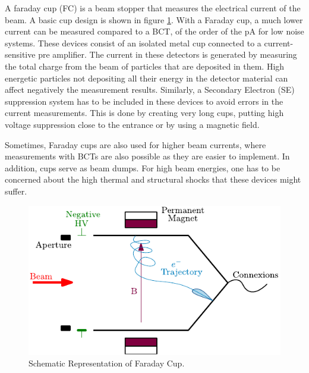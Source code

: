 A faraday cup (FC) is a beam stopper that measures the electrical current of the beam. A basic cup design is shown in figure \ref{fig:FaradayCup}. With a Faraday cup, a much lower current can be measured compared to a BCT, of the order of the \si[]{\pico \ampere} for low noise systems. These devices consist of an isolated metal cup connected to a current-sensitive pre amplifier. The current in these detectors is generated by measuring the total charge from the beam of particles that are deposited in them. High energetic particles not depositing all their energy in the detector material can affect negatively the measurement results. Similarly, a Secondary Electron (SE) suppression system has to be included in these devices to avoid errors in the current measurements. This is done by creating very long cups, putting high voltage suppression close to the entrance or by using a magnetic field. 

Sometimes, Faraday cups are also used for higher beam currents, where measurements with BCTs are also possible as they are easier to implement. In addition, cups serve as beam dumps. For high beam energies, one has to be concerned about the high thermal and structural shocks that these devices might suffer.

\begin{figure}[h]
    \centering
    \includegraphics[width=0.6\columnwidth]{FCschema/FCschema.pdf}
    \caption{Schematic Representation of Faraday Cup. }
    \label{fig:FaradayCup}
\end{figure}
